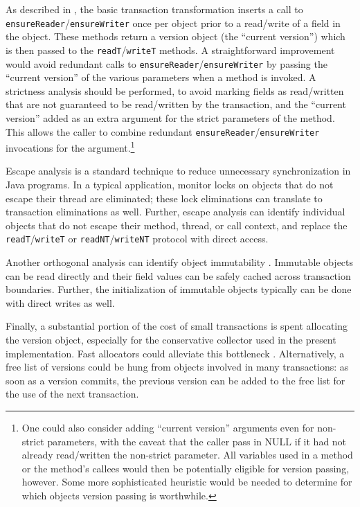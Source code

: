As described in , the basic transaction
transformation inserts a call to
\texttt{ensureReader}/\texttt{ensureWriter} once per object prior to a
read/write of a field in the object.  These methods return a version
object (the ``current version'') which is then passed to the
\texttt{readT}/\texttt{writeT} methods.  A straightforward improvement
would avoid redundant calls to
\texttt{ensureReader}/\texttt{ensureWriter} by passing the ``current
version'' of the various parameters when a method is invoked.  A
strictness analysis should be performed, to avoid marking fields as
read/written that are not guaranteed to be read/written by the
transaction, and the ``current version'' added as an extra argument
for the strict parameters of the method.  This allows the caller to
combine redundant \texttt{ensureReader}/\texttt{ensureWriter}
invocations for the argument.\footnote{One could also consider adding
``current version'' arguments even for non-strict parameters, with the
  caveat that the caller pass in NULL if it had not already
  read/written the non-strict parameter.
  All variables used in a method or the method's callees would then be
  potentially eligible for version passing, however.  Some more sophisticated
  heuristic would be needed to determine for which objects
  version passing is worthwhile.}

Escape analysis \cite{WhaleyRi99} is a standard technique to reduce
unnecessary synchronization in Java programs.  In a typical
application, monitor locks on objects that do not escape their thread
are eliminated; these lock eliminations can translate to transaction
eliminations as well.  Further, escape analysis can identify
individual objects that do not escape their method, thread,
or call context, and replace the \texttt{readT}/\texttt{writeT} or
\texttt{readNT}/\texttt{writeNT} protocol with direct access.

Another orthogonal analysis can identify object immutability
\cite{ZibinPoArKiEr07}.  Immutable objects can be read directly and
their field values can be safely cached across transaction boundaries.
Further, the initialization of immutable objects typically can be done
with direct writes as well.

Finally, a substantial portion of the cost of small transactions is
spent allocating the version object, especially for the conservative
collector used in the present implementation.  Fast allocators could
alleviate this bottleneck \cite{Appel89}.  Alternatively, a free list
of versions could be hung from objects involved in many transactions:
as soon as a version commits, the previous version can be added to the
free list for the use of the next transaction.

